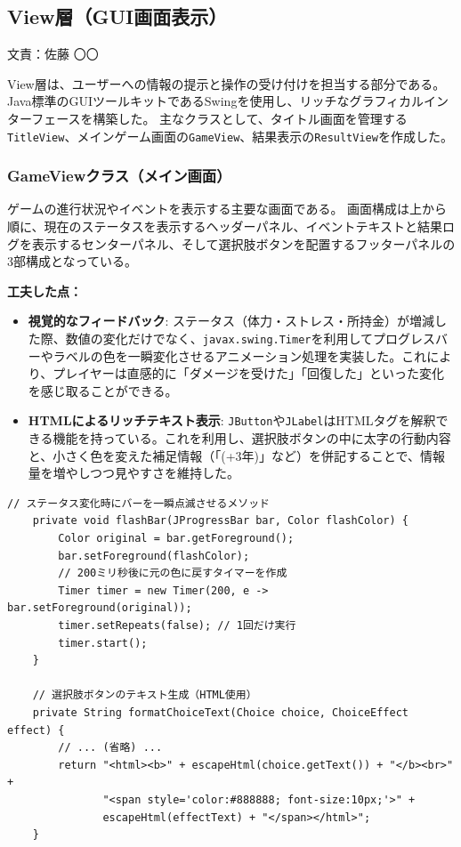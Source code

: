 \documentclass[a4paper,11pt]{jsarticle}
\begin{document}
\subsection{View層（GUI画面表示）}
\begin{flushright}
文責：佐藤 〇〇
\end{flushright}

View層は、ユーザーへの情報の提示と操作の受け付けを担当する部分である。
Java標準のGUIツールキットであるSwingを使用し、リッチなグラフィカルインターフェースを構築した。
主なクラスとして、タイトル画面を管理する\texttt{TitleView}、メインゲーム画面の\texttt{GameView}、結果表示の\texttt{ResultView}を作成した。

\subsubsection{GameViewクラス（メイン画面）}
ゲームの進行状況やイベントを表示する主要な画面である。
画面構成は上から順に、現在のステータスを表示するヘッダーパネル、イベントテキストと結果ログを表示するセンターパネル、そして選択肢ボタンを配置するフッターパネルの3部構成となっている。

\textbf{工夫した点：}
\begin{itemize}
    \item \textbf{視覚的なフィードバック}: ステータス（体力・ストレス・所持金）が増減した際、数値の変化だけでなく、\texttt{javax.swing.Timer}を利用してプログレスバーやラベルの色を一瞬変化させるアニメーション処理を実装した。これにより、プレイヤーは直感的に「ダメージを受けた」「回復した」といった変化を感じ取ることができる。
    \item \textbf{HTMLによるリッチテキスト表示}: \texttt{JButton}や\texttt{JLabel}はHTMLタグを解釈できる機能を持っている。これを利用し、選択肢ボタンの中に太字の行動内容と、小さく色を変えた補足情報（「(+3年)」など）を併記することで、情報量を増やしつつ見やすさを維持した。
\end{itemize}

\begin{lstlisting}[caption=GameView.java（視覚効果の実装）, label=code:view_flash]
    // ステータス変化時にバーを一瞬点滅させるメソッド
    private void flashBar(JProgressBar bar, Color flashColor) {
        Color original = bar.getForeground();
        bar.setForeground(flashColor);
        // 200ミリ秒後に元の色に戻すタイマーを作成
        Timer timer = new Timer(200, e -> bar.setForeground(original));
        timer.setRepeats(false); // 1回だけ実行
        timer.start();
    }

    // 選択肢ボタンのテキスト生成（HTML使用）
    private String formatChoiceText(Choice choice, ChoiceEffect effect) {
        // ... (省略) ...
        return "<html><b>" + escapeHtml(choice.getText()) + "</b><br>" +
               "<span style='color:#888888; font-size:10px;'>" +
               escapeHtml(effectText) + "</span></html>";
    }
\end{lstlisting}
\end{document}
